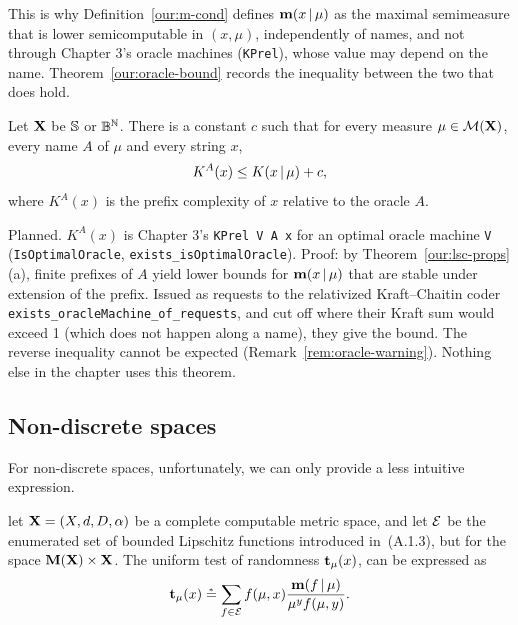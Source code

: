 \begin{formalization}
This is why Definition~\ref{our:m-cond} defines $\mathbf{m}(x \,\vert\, \mu)$ as the maximal semimeasure
that is lower semicomputable in $(x,\mu)$, independently of names, and not through Chapter 3's
oracle machines (\texttt{KPrel}), whose value may depend on the name. Theorem~\ref{our:oracle-bound}
records the inequality between the two that does hold.
\end{formalization}

\begin{ourtheorem}\label{our:oracle-bound}
Let \( \mathbf{X} \) be \( \mathbb{S} \) or \( \mathbb{B}^{\mathbb{N}} \).
There is a constant \( c \) such that for every measure \( \mu\in\mathcal{M}(\mathbf{X}) \), every name \( A \)
of \( \mu \) and every string \( x \),
 \[
   K^{A}(x) \le K(x \,\vert\, \mu) + c,
 \]
where \( K^{A}(x) \) is the prefix complexity of \( x \) relative to the oracle \( A \).
\end{ourtheorem}

\begin{formalization}
Planned. $K^{A}(x)$ is Chapter 3's \texttt{KPrel V A x} for an optimal oracle machine
\texttt{V} (\texttt{IsOptimalOracle}, \texttt{exists\_isOptimalOracle}). Proof: by
Theorem~\ref{our:lsc-props}(a), finite prefixes of $A$ yield lower bounds for
$\mathbf{m}(x \,\vert\, \mu)$ that are stable under extension of the prefix. Issued as requests to the
relativized Kraft--Chaitin coder \texttt{exists\_oracleMachine\_of\_requests}, and cut off where
their Kraft sum would exceed 1 (which does not happen along a name), they give the bound. The
reverse inequality cannot be expected (Remark~\ref{rem:oracle-warning}). Nothing else in the
chapter uses this theorem.
\end{formalization}


\subsection{Non-discrete spaces}
For non-discrete spaces, unfortunately, we can only provide a less
intuitive expression.

 \begin{proposition}\label{thm:test-charac}
  \notready
let \( \mathbf{X}=(X, d, D, \alpha) \) be a complete
computable metric space, and let \( \mathcal{E} \) be the enumerated set of bounded
Lipschitz functions introduced in~(A.1.3), 
but for the space \( \mathbf{M}(\mathbf{X}) \times \mathbf{X} \).
The uniform test of randomness \( \mathbf{t}_{\mu}(x) \), can be expressed as
 \begin{equation}\label{eq:test-charac}
  \mathbf{t}_{\mu}(x) \stackrel{{}_*}{=} 
  \sum_{f \in \mathcal{E}}f(\mu,x)\frac{\mathbf{m}(f \,\vert\, \mu)}{\mu^{y} f(\mu, y)}.
 \end{equation}
 \end{proposition}

